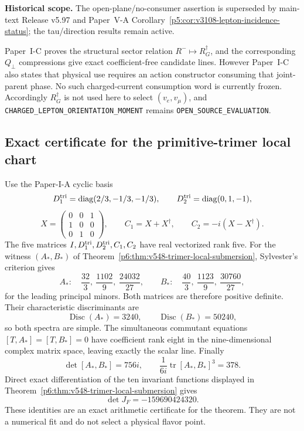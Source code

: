 \documentclass[11pt,a4paper]{article}
\begin{document}
\begin{remark}
\label{p6:rem:v596-rg-consumption-firewall}
\noindent\textbf{Historical scope.} The open-plane/no-consumer assertion is superseded by main-text Release v5.97 and Paper~V-A Corollary~\ref{p5:cor:v3108-lepton-incidence-status}; the tau/direction results remain active.

Paper~I-C proves the structural sector relation
$R^-\mapsto R_G^\dagger$, and the corresponding $Q_\perp$ compressions give
exact coefficient-free candidate lines.  However Paper~I-C also states that
physical use requires an action constructor consuming that joint-parent
phase.  No such charged-current consumption word is currently frozen.
Accordingly $R_G^\dagger$ is not used here to select $(v_e,v_\mu)$, and
\texttt{CHARGED\_LEPTON\_ORIENTATION\_MOMENT} remains
\texttt{OPEN\_SOURCE\_EVALUATION}.
\end{remark}




\subsection{Exact certificate for the primitive-trimer local chart}
\label{p6:app:v548-trimer-local-chart-certificate}
Use the Paper-I-A cyclic basis
\[
 D^{\mathrm{tri}}_1=\operatorname{diag}(2/3,-1/3,-1/3),\qquad
 D^{\mathrm{tri}}_2=\operatorname{diag}(0,1,-1),
\]
\[
 X=\begin{pmatrix}0&0&1\\1&0&0\\0&1&0\end{pmatrix},\qquad
 C_1=X+X^\dagger,\qquad C_2=-i(X-X^\dagger).
\]
The five matrices $I,D^{\mathrm{tri}}_1,D^{\mathrm{tri}}_2,C_1,C_2$ have real vectorized rank five.
For the witness $(A_*,B_*)$ of
Theorem~\ref{p6:thm:v548-trimer-local-submersion}, Sylvester's criterion gives
\[
 A_*:\quad \frac{32}{3},\ \frac{1102}{9},\ \frac{24032}{27},
\qquad
 B_*:\quad \frac{40}{3},\ \frac{1123}{9},\ \frac{30760}{27},
\]
for the leading principal minors.  Both matrices are therefore positive
definite.  Their characteristic discriminants are
\[
 \operatorname{Disc}(A_*)=3240,
 \qquad
 \operatorname{Disc}(B_*)=50240,
\]
so both spectra are simple.  The simultaneous commutant equations
$[T,A_*]=[T,B_*]=0$ have coefficient rank eight in the nine-dimensional
complex matrix space, leaving exactly the scalar line.  Finally
\[
 \det[A_*,B_*]=756i,
 \qquad
 \frac1{6i}\operatorname{tr}[A_*,B_*]^3=378.
\]
Direct exact differentiation of the ten invariant functions displayed in
Theorem~\ref{p6:thm:v548-trimer-local-submersion} gives
\[
 \det J_F=-159690424320.
\]
These identities are an exact arithmetic certificate for the theorem.  They
are not a numerical fit and do not select a physical flavor point.
\end{document}
